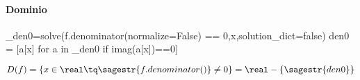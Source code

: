 \paragraph{Dominio}


\begin{sagesilent}
_den0=solve(f.denominator(normalize=False) == 0,x,solution_dict=false)
den0 = [a[x] for a in _den0 if imag(a[x])==0]
\end{sagesilent}
\[
	D(f) = \{x\in\real \tq \sagestr{f.denominator()} \neq 0\} = \real-\{\sagestr{den0}\}
\]